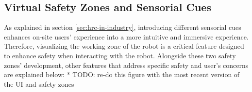 
\subsection{Virtual Safety Zones and Sensorial Cues}
\label{subsection:virtual-safety-zones} 

As explained in section \ref{sec:hrc-in-industry}, introducing different sensorial cues enhances on-site users' experience into a more intuitive and immersive experience. Therefore, visualizing the working zone of the robot is a critical feature designed to enhance safety when interacting with the robot. Alongside these two safety zones' development, other features that address specific safety and user's concerns are explained below:  
* TODO: re-do this figure with the most recent version of the UI and safety-zones


